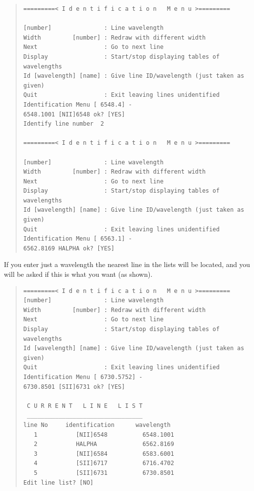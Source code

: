 \begin{quote}\begin{verbatim}
=========< I d e n t i f i c a t i o n   M e n u >=========
 
[number]               : Line wavelength
Width         [number] : Redraw with different width
Next                   : Go to next line
Display                : Start/stop displaying tables of wavelengths
Id [wavelength] [name] : Give line ID/wavelength (just taken as given)
Quit                   : Exit leaving lines unidentified
Identification Menu [ 6548.4] -
6548.1001 [NII]6548 ok? [YES]
Identify line number  2
 
=========< I d e n t i f i c a t i o n   M e n u >=========
 
[number]               : Line wavelength
Width         [number] : Redraw with different width
Next                   : Go to next line
Display                : Start/stop displaying tables of wavelengths
Id [wavelength] [name] : Give line ID/wavelength (just taken as given)
Quit                   : Exit leaving lines unidentified
Identification Menu [ 6563.1] -
6562.8169 HALPHA ok? [YES]
\end{verbatim}\end{quote}

If you enter just a wavelength the nearest line in the lists will be
located, and you will be asked if this is what you want (as shown).

\begin{quote}\begin{verbatim}
=========< I d e n t i f i c a t i o n   M e n u >=========
[number]               : Line wavelength
Width         [number] : Redraw with different width
Next                   : Go to next line
Display                : Start/stop displaying tables of wavelengths
Id [wavelength] [name] : Give line ID/wavelength (just taken as given)
Quit                   : Exit leaving lines unidentified
Identification Menu [ 6730.5752] -
6730.8501 [SII]6731 ok? [YES]
 
 C U R R E N T   L I N E   L I S T
 _________________________________
line No     identification      wavelength
   1           [NII]6548          6548.1001
   2           HALPHA             6562.8169
   3           [NII]6584          6583.6001
   4           [SII]6717          6716.4702
   5           [SII]6731          6730.8501
Edit line list? [NO]
\end{verbatim}\end{quote}


